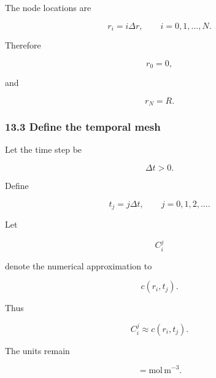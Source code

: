 \documentclass[11pt,a4paper]{article}
\begin{document}
The node locations are

\begin{equation}
r_i=i\Delta r,
\qquad
i=0,1,\ldots,N.
\tag{TRISO-DIS-103}
\label{eq:triso-dis-103}
\end{equation}

Therefore

\begin{equation}
r_0=0,
\tag{TRISO-DIS-104}
\label{eq:triso-dis-104}
\end{equation}

and

\begin{equation}
r_N=R.
\tag{TRISO-DIS-105}
\label{eq:triso-dis-105}
\end{equation}

\subsubsection*{13.3 Define the temporal mesh}

Let the time step be

\begin{equation}
\Delta t>0.
\tag{TRISO-DIS-106}
\label{eq:triso-dis-106}
\end{equation}

Define

\begin{equation}
t_j=j\Delta t,
\qquad
j=0,1,2,\ldots.
\tag{TRISO-DIS-107}
\label{eq:triso-dis-107}
\end{equation}

Let

\begin{equation}
C_i^j
\tag{TRISO-DIS-108}
\label{eq:triso-dis-108}
\end{equation}

denote the numerical approximation to

\begin{equation}
c(r_i,t_j).
\tag{TRISO-DIS-109}
\label{eq:triso-dis-109}
\end{equation}

Thus

\begin{equation}
C_i^j\approx c(r_i,t_j).
\tag{TRISO-DIS-110}
\label{eq:triso-dis-110}
\end{equation}

The units remain

\begin{equation}
[C_i^j]=\mathrm{mol\,m^{-3}}.
\tag{TRISO-DIS-111}
\label{eq:triso-dis-111}
\end{equation}
\end{document}
